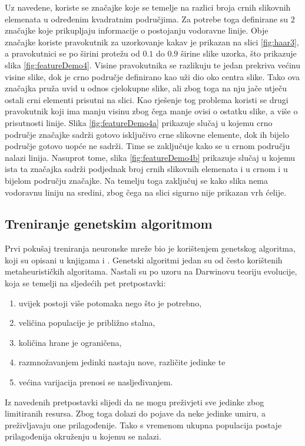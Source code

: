 \documentclass[times, utf8, zavrsni, numeric]{fer}
\begin{document}
Uz navedene, koriste se značajke koje se temelje na razlici broja crnih slikovnih elemenata u određenim kvadratnim područjima.
Za potrebe toga definirane su $2$ značajke koje prikupljaju informacije o postojanju vodoravne linije. 
Obje značajke koriste pravokutnik za uzorkovanje kakav je prikazan na slici \ref{fig:haar3}, a pravokutnici se po širini protežu od $0.1$ do $0.9$ širine slike uzorka, što prikazuje slika \ref{fig:featureDemo4}.
Visine pravokutnika se razlikuju te jedan prekriva većinu visine slike, dok je crno područje definirano kao uži dio oko centra slike.
Tako ova značajka pruža uvid u odnos cjelokupne slike, ali zbog toga na nju jače utječu ostali crni elementi prisutni na slici.
Kao rješenje tog problema koristi se drugi pravokutnik koji ima manju visinu zbog čega manje ovisi o ostatku slike, a više o prisutnosti linije.
Slika \ref{fig:featureDemo4a} prikazuje slučaj u kojemu crno područje značajke sadrži gotovo isključivo crne slikovne elemente, dok ih bijelo područje gotovo uopće ne sadrži.
Time se zaključuje kako se u crnom području nalazi linija.
Nasuprot tome, slika \ref{fig:featureDemo4b} prikazuje slučaj u kojemu ista ta značajka sadrži podjednak broj crnih slikovnih elemenata i u crnom i u bijelom području značajke.
Na temelju toga zaključuj se kako slika nema vodoravnu liniju na sredini, zbog čega na slici sigurno nije prikazan vrh ćelije.

\subsection{Treniranje genetskim algoritmom}
Prvi pokušaj treniranja neuronske mreže bio je korištenjem genetskog algoritma, koji su opisani u knjigama \cite{optjava} i \cite{GeneticAlgorithms}.
Genetski algoritmi jedan su od često korištenih metaheurističkih algoritama.
Nastali su po uzoru na Darwinovu teoriju evolucije, koja se temelji na sljedećih pet pretpostavki: 
\begin{enumerate}
\item uvijek postoji više potomaka nego što je potrebno,
\item veličina populacije je približno stalna,
\item količina hrane je ograničena,
\item razmnožavanjem jedinki nastaju nove, različite jedinke te
\item većina varijacija prenosi se nasljeđivanjem.
\end{enumerate}
Iz navedenih pretpostavki slijedi da ne mogu preživjeti sve jedinke zbog limitiranih resursa.
Zbog toga dolazi do pojave da neke jedinke umiru, a preživljavaju one prilagođenije.
Tako s vremenom ukupna populacija postaje prilagođenija okruženju u kojemu se nalazi.\\
\end{document}

